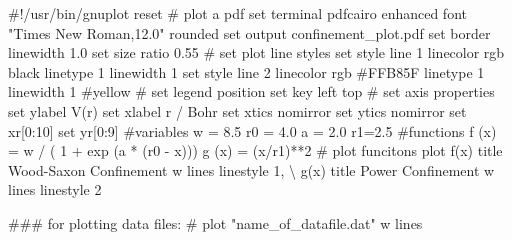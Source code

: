 \documentclass[
  letterpaper,
  DIV=11,
  numbers=noendperiod]{scrreprt}
\newenvironment{Shaded}{\begin{snugshade}}{\end{snugshade}}
\newcommand{\BuiltInTok}[1]{\textcolor[rgb]{0.00,0.23,0.31}{#1}}
\newcommand{\CommentTok}[1]{\textcolor[rgb]{0.37,0.37,0.37}{#1}}
\newcommand{\DecValTok}[1]{\textcolor[rgb]{0.68,0.00,0.00}{#1}}
\newcommand{\FloatTok}[1]{\textcolor[rgb]{0.68,0.00,0.00}{#1}}
\newcommand{\NormalTok}[1]{\textcolor[rgb]{0.00,0.23,0.31}{#1}}
\newcommand{\OperatorTok}[1]{\textcolor[rgb]{0.37,0.37,0.37}{#1}}
\newcommand{\StringTok}[1]{\textcolor[rgb]{0.13,0.47,0.30}{#1}}
\begin{document}
\begin{Shaded}
\begin{Highlighting}[]
    \CommentTok{\#!/usr/bin/gnuplot}
\NormalTok{    reset}
    \CommentTok{\# plot a pdf}
    \BuiltInTok{set}\NormalTok{ terminal pdfcairo enhanced font }\StringTok{"Times New Roman,12.0"}\NormalTok{ rounded}
    \BuiltInTok{set}\NormalTok{ output }\StringTok{\textquotesingle{}confinement\_plot.pdf\textquotesingle{}}
    \BuiltInTok{set}\NormalTok{ border linewidth }\FloatTok{1.0}
    \BuiltInTok{set}\NormalTok{ size ratio }\FloatTok{0.55}
    \CommentTok{\# set plot line styles}
    \BuiltInTok{set}\NormalTok{ style line }\DecValTok{1}\NormalTok{ linecolor rgb }\StringTok{\textquotesingle{}black\textquotesingle{}}\NormalTok{   linetype }\DecValTok{1}\NormalTok{ linewidth }\DecValTok{1}
    \BuiltInTok{set}\NormalTok{ style line }\DecValTok{2}\NormalTok{ linecolor rgb }\StringTok{\textquotesingle{}\#FFB85F\textquotesingle{}}\NormalTok{ linetype }\DecValTok{1}\NormalTok{ linewidth }\DecValTok{1}   \CommentTok{\#yellow}
    \CommentTok{\# set legend position}
    \BuiltInTok{set}\NormalTok{ key left top}
    \CommentTok{\# set axis properties}
    \BuiltInTok{set}\NormalTok{ ylabel }\StringTok{\textquotesingle{}V(r)\textquotesingle{}}
    \BuiltInTok{set}\NormalTok{ xlabel }\StringTok{\textquotesingle{}r / Bohr\textquotesingle{}}
    \BuiltInTok{set}\NormalTok{ xtics nomirror}
    \BuiltInTok{set}\NormalTok{ ytics nomirror}
    \BuiltInTok{set}\NormalTok{ xr[}\DecValTok{0}\NormalTok{:}\DecValTok{10}\NormalTok{]}
    \BuiltInTok{set}\NormalTok{ yr[}\DecValTok{0}\NormalTok{:}\DecValTok{9}\NormalTok{]}
    \CommentTok{\#variables}
\NormalTok{    w }\OperatorTok{=} \FloatTok{8.5}
\NormalTok{    r0 }\OperatorTok{=} \FloatTok{4.0}
\NormalTok{    a }\OperatorTok{=} \FloatTok{2.0}
\NormalTok{    r1}\OperatorTok{=}\FloatTok{2.5}
    \CommentTok{\#functions}
\NormalTok{    f (x) }\OperatorTok{=}\NormalTok{ w }\OperatorTok{/}\NormalTok{ ( }\DecValTok{1} \OperatorTok{+}\NormalTok{ exp (a }\OperatorTok{*}\NormalTok{ (r0 }\OperatorTok{{-}}\NormalTok{ x)))}
\NormalTok{    g (x) }\OperatorTok{=}\NormalTok{ (x}\OperatorTok{/}\NormalTok{r1)}\OperatorTok{**}\DecValTok{2}
    \CommentTok{\# plot funcitons}
\NormalTok{    plot  f(x)  title }\StringTok{\textquotesingle{}Wood{-}Saxon Confinement\textquotesingle{}}\NormalTok{ w lines linestyle }\DecValTok{1}\NormalTok{, }\OperatorTok{\textbackslash{}}
\NormalTok{              g(x)  title }\StringTok{\textquotesingle{}Power Confinement\textquotesingle{}}\NormalTok{      w lines linestyle }\DecValTok{2}

    \CommentTok{\#\#\# for plotting data files:}
    \CommentTok{\# plot "name\_of\_datafile.dat" w lines }
\end{Highlighting}
\end{Shaded}
\end{document}
